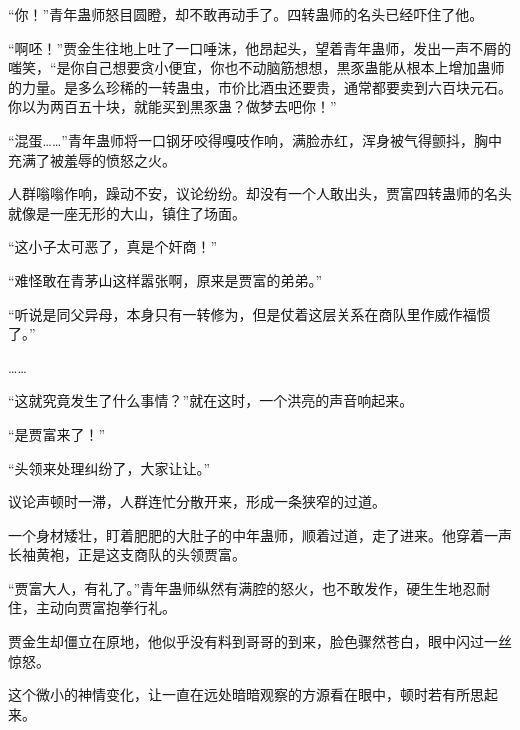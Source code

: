 \begin{this_body}
“你！”青年蛊师怒目圆瞪，却不敢再动手了。四转蛊师的名头已经吓住了他。

“啊呸！”贾金生往地上吐了一口唾沫，他昂起头，望着青年蛊师，发出一声不屑的嗤笑，“是你自己想要贪小便宜，你也不动脑筋想想，黒豕蛊能从根本上增加蛊师的力量。是多么珍稀的一转蛊虫，市价比酒虫还要贵，通常都要卖到六百块元石。你以为两百五十块，就能买到黒豕蛊？做梦去吧你！”

“混蛋……”青年蛊师将一口钢牙咬得嘎吱作响，满脸赤红，浑身被气得颤抖，胸中充满了被羞辱的愤怒之火。

人群嗡嗡作响，躁动不安，议论纷纷。却没有一个人敢出头，贾富四转蛊师的名头就像是一座无形的大山，镇住了场面。

“这小子太可恶了，真是个奸商！”

“难怪敢在青茅山这样嚣张啊，原来是贾富的弟弟。”

“听说是同父异母，本身只有一转修为，但是仗着这层关系在商队里作威作福惯了。”

……

“这就究竟发生了什么事情？”就在这时，一个洪亮的声音响起来。

“是贾富来了！”

“头领来处理纠纷了，大家让让。”

议论声顿时一滞，人群连忙分散开来，形成一条狭窄的过道。

一个身材矮壮，盯着肥肥的大肚子的中年蛊师，顺着过道，走了进来。他穿着一声长袖黄袍，正是这支商队的头领贾富。

“贾富大人，有礼了。”青年蛊师纵然有满腔的怒火，也不敢发作，硬生生地忍耐住，主动向贾富抱拳行礼。

贾金生却僵立在原地，他似乎没有料到哥哥的到来，脸色骤然苍白，眼中闪过一丝惊怒。

这个微小的神情变化，让一直在远处暗暗观察的方源看在眼中，顿时若有所思起来。

\end{this_body}

